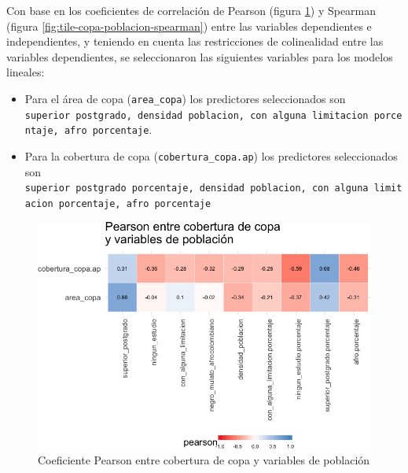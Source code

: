 \documentclass[12pt,a4paper,openany]{book}
\theoremstyle{definition}
\theoremstyle{definition}
\theoremstyle{definition}
\theoremstyle{remark}
\begin{document}
Con base en los coeficientes de correlación de Pearson (figura
\ref{fig:tile-copa-poblacion-pearson}) y Spearman (figura
\ref{fig:tile-copa-poblacion-spearman}) entre las variables dependientes
e independientes, y teniendo en cuenta las restricciones de colinealidad
entre las variables dependientes, se seleccionaron las siguientes
variables para los modelos lineales:

\begin{itemize}
\item
  Para el área de copa (\texttt{area\_copa}) los predictores
  seleccionados son
  \texttt{superior\ postgrado,\ densidad\ poblacion,\ con\ alguna\ limitacion\ porcentaje,\ afro\ porcentaje}.
\item
  Para la cobertura de copa (\texttt{cobertura\_copa.ap}) los
  predictores seleccionados son
  \texttt{superior\ postgrado\ porcentaje,\ densidad\ poblacion,\ con\ alguna\ limitacion\ porcentaje,\ afro\ porcentaje}
\end{itemize}

\begin{figure}

{\centering \includegraphics[width=1\linewidth]{tesis-unigis_files/figure-latex/tile-copa-poblacion-pearson-1} 

}

\caption{Coeficiente Pearson entre cobertura de copa
 y variables de población}\label{fig:tile-copa-poblacion-pearson}
\end{figure}
\end{document}

